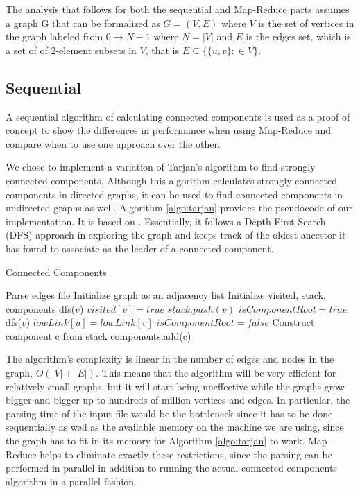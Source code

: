 The analysis that follows for both the sequential and Map-Reduce parts assumes a graph G that can be formalized as $G=(V,E)$ where $V$ is the set of vertices in the graph labeled from $0 \to N-1$ where $N=|V|$ and $E$ is the edges set, which is a set of of 2-element subsets in $V$, that is $E \subseteq \{\{u,v\}: \in V\}$.

\subsection{Sequential}
A sequential algorithm of calculating connected components is used as a proof of concept to show the differences in performance when using Map-Reduce and compare when to use one approach over the other.

We chose to implement a variation of Tarjan's algorithm to find strongly connected components. Although this algorithm calculates strongly connected components in directed graphs, it can be used to find connected components in undirected graphs as well. Algorithm \ref{algo:tarjan} provides the pseudocode of our implementation. It is based on \cite{tarjan}. Essentially, it follows a Depth-First-Search (DFS) approach in exploring the graph and keeps track of the oldest ancestor it has found to associate as the leader of a connected component.

\begin{algorithm}
	\caption{Connected Components}
	\label{algo:tarjan}
	\begin{algorithmic}[1]
		\State Parse edges file
		\State Initialize graph as an adjacency list
		\State Initialize visited, stack, components
				\State dfs($v$)
			\EndIf
		\EndFor
			\State $visited[v] = true$
			\State $stack.push(v)$
			\State $isComponentRoot = true$
					\State dfs($v$)
				\EndIf
					\State $lowLink[u] = lowLink[v]$
					\State $isComponentRoot = false$
				\EndIf
			\EndFor
				\State Construct component c from stack
				\State components.add(c)
			\EndIf
		\EndFunction
	\end{algorithmic}
\end{algorithm}

The algorithm's complexity is linear in the number of edges and nodes in the graph, \ie $O(|V| + |E|)$. This means that the algorithm will be very efficient for relatively small graphs, but it will start being uneffective while the graphs grow bigger and bigger up to hundreds of million vertices and edges. In particular, the parsing time of the input file would be the bottleneck since it has to be done sequentially as well as the available memory on the machine we are using, since the graph has to fit in its memory for Algorithm \ref{algo:tarjan} to work. Map-Reduce helps to eliminate exactly these restrictions, since the parsing can be performed in parallel in addition to running the actual connected components algorithm in a parallel fashion.

